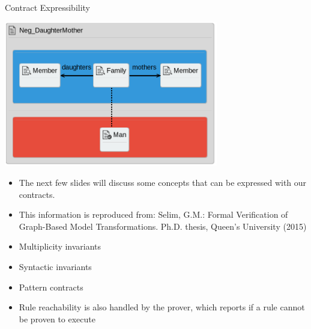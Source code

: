 \documentclass[xcolor=dvipsnames, 12pt, handout]{beamer}
\begin{document}
\begin{frame}{Contract Expressibility}
\begin{center}
\includegraphics[width=0.7\textwidth]{figures/Pos_DaughterMother}
\end{center}
\begin{itemize}[<+->]
\item The next few slides will discuss some concepts that can be expressed with our contracts.
\item This information is reproduced from: Selim, G.M.: Formal Verification of Graph-Based Model
Transformations. Ph.D. thesis, Queen’s University (2015)
\end{itemize}
\begin{itemize}
\item Multiplicity invariants
\item Syntactic invariants
\item Pattern contracts
\end{itemize}

\begin{itemize}
\item Rule reachability is also handled by the prover, which reports if a rule cannot be proven to execute
\end{itemize}
\end{frame}
\end{document}
